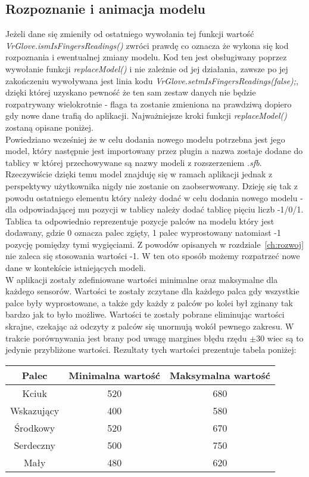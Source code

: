 	\subsection{Rozpoznanie i animacja modelu}
	\label{subsec:rozpoznanie}
	Jeżeli dane się zmieniły od ostatniego wywołania tej funkcji wartość \\  \textit{VrGlove.ismIsFingersReadings()} zwróci prawdę co oznacza że wykona się kod rozpoznania i ewentualnej zmiany modelu. Kod ten jest obsługiwany poprzez wywołanie funkcji \textit{replaceModel()} i nie zależnie od jej działania, zawsze po jej zakończeniu wywoływana jest linia kodu \textit{VrGlove.setmIsFingersReadings(false);}, dzięki której uzyskano pewność że ten sam zestaw danych nie będzie rozpatrywany wielokrotnie -  flaga ta zostanie zmieniona na prawdziwą dopiero gdy nowe dane trafią do aplikacji. Najważniejsze kroki funkcji \textit{replaceModel()} zostaną opisane poniżej. \\
	Powiedziano wcześniej że w celu dodania nowego modelu potrzebna jest jego model, który następnie jest importowany przez plugin a nazwa zostaje dodane do tablicy w której przechowywane są nazwy modeli z rozszerzeniem \textit{.sfb}. Rzeczywiście dzięki temu model znajduję się w ramach aplikacji jednak z perspektywy użytkownika nigdy nie zostanie on zaobserwowany. Dzieję się tak z powodu ostatniego elementu który należy dodać w celu dodania nowego modelu - dla odpowiadającej mu pozycji w tablicy należy dodać tablicę pięciu liczb -1/0/1. Tablica ta odpowiednio reprezentuje pozycje palców na modelu który jest dodawany, gdzie 0 oznacza palec zgięty, 1 palec wyprostowany natomiast -1 pozycję pomiędzy tymi wygięciami. Z powodów opisanych w rozdziale~\ref{ch:rozwoj} nie zaleca się stosowania wartości -1. W ten oto sposób możemy rozpatrzeć nowe dane w kontekście istniejących modeli. \\
	W aplikacji zostały zdefiniowane wartości minimalne oraz maksymalne dla każdego sensorów. Wartości te zostały zczytane dla każdego palca gdy wszystkie palce były wyprostowane, a także gdy każdy z palców po kolei był zginany tak bardzo jak to było możliwe. Wartości te zostały pobrane eliminując wartości skrajne, czekając aż odczyty z palców się unormują wokół pewnego zakresu. W trakcie porównywania jest brany pod uwagę margines błędu rzędu $\pm 30$ wiec są to jedynie przybliżone wartości. Rezultaty tych wartości prezentuje tabela poniżej:
\begin{center}
\begin{tabular}{|c|c|c|}
\hline
Palec & Minimalna wartość & Maksymalna wartość \\ \hline
Kciuk & 520 & 680\\ \hline
Wskazujący & 400 & 580\\ \hline
Środkowy & 520 & 670\\ \hline
Serdeczny & 500 & 750 \\ \hline
Mały & 480 & 620 \\ \hline
\hline
\end{tabular}
\end{center}
